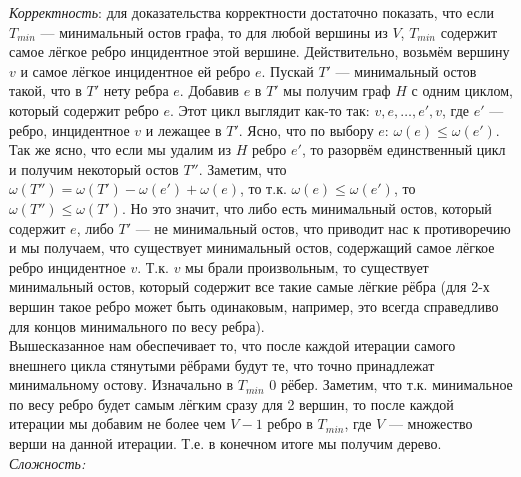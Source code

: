 \begin{algorithmic}[1]
		\EndIf
	\EndFor
\EndWhile
\end{algorithmic}
\textit{Корректность}: для доказательства корректности достаточно показать, что если $T_{min}$ --- минимальный остов графа, то
для любой вершины из $V$, $T_{min}$ содержит самое лёгкое ребро инцидентное этой вершине. Действительно, возьмём вершину
$v$ и самое лёгкое инцидентное ей ребро $e$. Пускай $T'$ --- минимальный остов такой, что в $T'$ нету ребра $e$. Добавив
$e$ в $T'$ мы получим граф $H$ с одним циклом, который содержит ребро $e$. Этот цикл выглядит как-то так: $v,e,\ldots,e',v$,
где $e'$ --- ребро, инцидентное $v$ и лежащее в $T'$. Ясно, что по выбору $e$: $\omega(e) \leq \omega(e')$. Так же ясно,
что если мы удалим из $H$ ребро $e'$, то разорвём единственный цикл и получим некоторый остов $T''$. Заметим, что
$\omega(T'') = \omega(T') - \omega(e') + \omega(e)$, то т.к. $\omega(e) \leq \omega(e')$, то $\omega(T'')\leq \omega(T')$.
Но это значит, что либо есть минимальный остов, который содержит $e$, либо $T'$ --- не минимальный остов, что приводит нас
к противоречию и мы получаем, что существует минимальный остов, содержащий самое лёгкое ребро инцидентное $v$. Т.к. $v$ мы
брали произвольным, то существует минимальный остов, который содержит все такие самые лёгкие рёбра (для 2-х вершин такое ребро
может быть одинаковым, например, это всегда справедливо для концов минимального по весу ребра).\\
Вышесказанное нам обеспечивает то, что после каждой итерации самого внешнего цикла стянутыми рёбрами
будут те, что точно принадлежат минимальному остову. Изначально в $T_{min}$ $0$ рёбер. Заметим, что т.к. минимальное
по весу ребро будет самым лёгким сразу для 2 вершин, то после каждой итерации мы добавим не более чем $V-1$ ребро в $T_{min}$,
где $V$ --- множество верши на данной итерации. Т.е. в конечном итоге мы получим дерево. \xqed\\
\textit{Сложность:}
